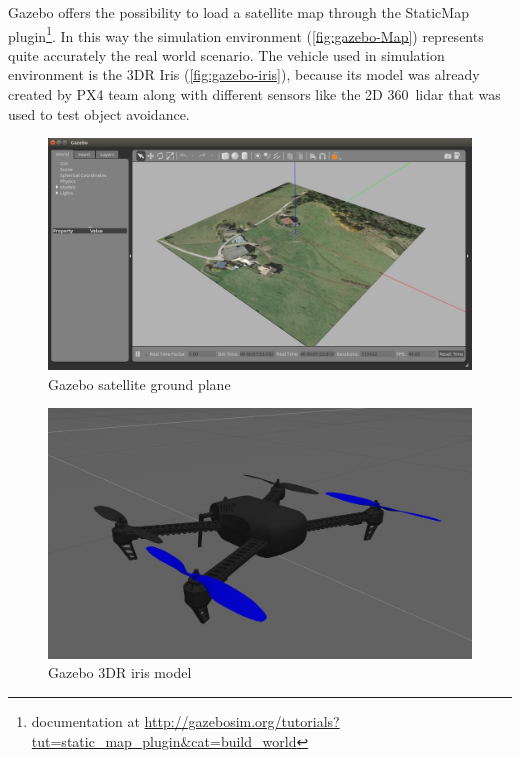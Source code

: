 Gazebo offers the possibility to load a satellite map through the \textsf{StaticMap} plugin\footnote{documentation at \url{http://gazebosim.org/tutorials?tut=static_map_plugin&cat=build_world}}. In this way the simulation environment (\autoref{fig:gazebo-Map}) represents  quite accurately the real world scenario.
The vehicle used in simulation environment is the 3DR Iris (\autoref{fig:gazebo-iris}), because its model was already created by PX4 team along with different sensors like the 2D 360\degree\ lidar that was used to test object avoidance.
\begin{figure}[h]
  \centering
  \includegraphics[width=.7\linewidth]{figures/C3/gazebo-ground-plane-world.png}
  \caption{Gazebo satellite ground plane}
  \label{fig:gazebo-Map}
\end{figure}
\begin{figure}[h]
  \centering
  \includegraphics[width=.5\linewidth]{figures/C3/simulation/iris-model1.jpg}
  \caption{Gazebo 3DR iris model}
  \label{fig:gazebo-iris}
\end{figure}

